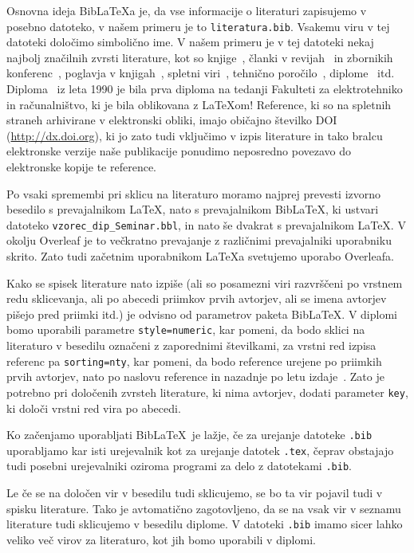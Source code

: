 \documentclass[a4paper,12pt,openright]{book}
\newcommand{\BibLaTeX}{{\sc Bib}\LaTeX}
\begin{document}
Osnovna ideja \BibLaTeX{a} je, da vse informacije o literaturi zapisujemo v posebno datoteko, v našem primeru je to \texttt{literatura.bib}.
Vsakemu viru v tej datoteki določimo simbolično ime.
V  našem primeru je v tej datoteki nekaj najbolj značilnih zvrsti literature, kot so knjige~\cite{lamport},
članki v revijah~\cite{leonardo} in zbornikih konferenc~\cite{ciuha2010visualization},
poglavja v knjigah~\cite{poglavje_springer},
spletni viri~\cite{slovarji,video},
tehnično poročilo~\cite{andersen2012kinect},
diplome~\cite{diploma} itd.
Diploma~\cite{diploma} iz leta 1990 je bila prva diploma na tedanji Fakulteti za elektrotehniko in računalništvo, ki je bila oblikovana z \LaTeX om!
Reference, ki so na spletnih straneh arhivirane v elektronski obliki, imajo običajno  \v stevilko DOI (\url{http://dx.doi.org}), ki jo zato tudi vključimo v izpis literature in tako bralcu elektronske verzije naše publikacije ponudimo neposredno povezavo do elektronske kopije te reference.

Po vsaki spremembi pri sklicu na literaturo moramo najprej prevesti izvorno besedilo s prevajalnikom \LaTeX, nato s prevajalnikom  \BibLaTeX, ki ustvari datoteko  {\tt vzorec\_dip\_Seminar.bbl}, in nato še dvakrat s prevajalnikom  \LaTeX.
V okolju Overleaf je to večkratno prevajanje z različnimi prevajalniki uporabniku skrito. Zato tudi začetnim uporabnikom \LaTeX a svetujemo uporabo Overleafa.

Kako se spisek literature nato izpiše (ali so posamezni viri razvrščeni po vrstnem redu sklicevanja, ali po abecedi priimkov prvih avtorjev, ali se imena avtorjev pišejo pred priimki itd.) je odvisno od parametrov paketa \BibLaTeX.
V diplomi bomo uporabili parametre
\texttt{style=numeric}, kar pomeni, da bodo sklici na literaturo v besedilu označeni z zaporednimi številkami, za vrstni red izpisa referenc pa
\texttt{sorting=nty}, kar pomeni, da bodo reference urejene po priimkih prvih avtorjev, nato po naslovu reference in nazadnje po letu izdaje~\cite{ctan}.
Zato je potrebno pri določenih zvrsteh literature, ki nima avtorjev, dodati parameter \texttt{key}, ki določi vrstni red vira po abecedi.

Ko začenjamo uporabljati \BibLaTeX\ je lažje, če za urejanje datoteke \texttt{.bib} uporabljamo kar isti urejevalnik kot za urejanje datotek \texttt{.tex},
čeprav obstajajo tudi posebni urejevalniki oziroma programi za delo z datotekami \texttt{.bib}.

Le če se  na določen vir v besedilu tudi sklicujemo, se bo ta vir pojavil tudi v spisku literature.
Tako je avtomatično zagotovljeno, da se na vsak vir v seznamu literature tudi sklicujemo v besedilu diplome.
V datoteki \texttt{.bib} imamo sicer lahko veliko več virov za literaturo, kot jih bomo uporabili v diplomi.
\end{document}
